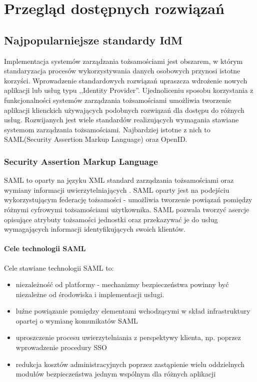 \chapter{Przegląd dostępnych rozwiązań}
\label{cha:przegladRozwiazan}


\section{Najpopularniejsze standardy IdM}
\label{sec:standardyIdM}

Implementacja systemów zarządzania tożsamościami jest obszarem, w którym standaryzacja procesów wykorzystywania danych osobowych przynosi istotne korzyści. Wprowadzenie standardowych rozwiązań upraszcza wdrożenie nowych aplikacji lub usług typu ,,Identity Provider''. Ujednoliceniu sposobu korzystania z funkcjonalności systemów zarządzania tożsamościami umożliwia tworzenie aplikacji klienckich używających podobnych rozwiązań dla dostępu do różnych usług. Rozwijanych jest wiele standardów realizujących wymagania stawiane systemom zarządzania tożsamościami. Najbardziej istotne z nich to SAML(Security Assertion Markup Language) oraz OpenID. 

\subsection{Security Assertion Markup Language}

	SAML to oparty na języku XML standard zarządzania tożsamościami oraz wymiany informacji uwierzytelniających \cite{Wisniewski05}. SAML oparty jest na podejściu wykorzystującym federację tożsamości - umożliwia tworzenie powiązań pomiędzy różnymi cyfrowymi tożsamościami użytkownika. SAML pozwala tworzyć asercje opisujące atrybuty tożsamości jednostki oraz przekazywać je do usług wymagających informacji identyfikujących swoich klientów.

	\subsubsection{Cele technologii SAML}

		Cele stawiane technologii SAML to\cite{Wisniewski05}:

		\begin{itemize}
		  \item niezależność od platformy - mechanizmy bezpieczeństwa powinny być niezależne od środowiska i implementacji usługi.
		  \item luźne powiązanie pomiędzy elementami wchodzącymi w skład infrastruktury opartej o wymianę komunikatów SAML
		  \item uproszczenie procesu uwierzytelniania z perspektywy klienta, np. poprzez wprowadzenie procedury SSO
		  \item redukcja kosztów administracyjnych poprzez zastąpienie wielu oddzielnych modułów bezpieczeństwa jednym wspólnym dla  różnych aplikacji
		\end{itemize}

